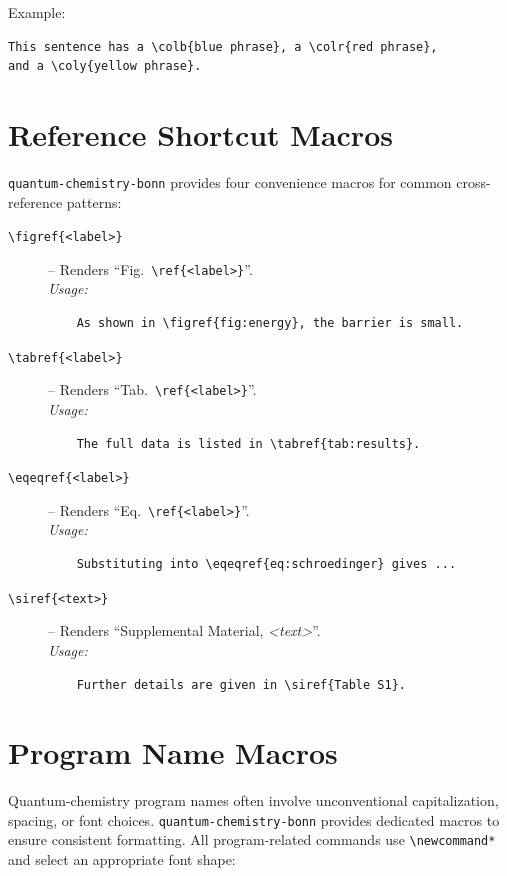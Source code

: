 \documentclass[a4paper,12pt]{article}
\begin{document}
\noindent Example:
\begin{verbatim}
This sentence has a \colb{blue phrase}, a \colr{red phrase}, 
and a \coly{yellow phrase}.
\end{verbatim}

\section{Reference Shortcut Macros}
\label{sec:refs}
\texttt{quantum-chemistry-bonn} provides four convenience macros for common cross-reference patterns:

\begin{description}
  \item[\texttt{\textbackslash figref\{<label>\}}] – Renders ``Fig.~\verb|\ref{<label>}|''.\\
    \textit{Usage:}
    \begin{verbatim}
    As shown in \figref{fig:energy}, the barrier is small.
    \end{verbatim}

  \item[\texttt{\textbackslash tabref\{<label>\}}] – Renders ``Tab.~\verb|\ref{<label>}|''.\\
    \textit{Usage:}
    \begin{verbatim}
    The full data is listed in \tabref{tab:results}.
    \end{verbatim}

  \item[\texttt{\textbackslash eqeqref\{<label>\}}] – Renders ``Eq.~\verb|\ref{<label>}|''.\\
    \textit{Usage:}
    \begin{verbatim}
    Substituting into \eqeqref{eq:schroedinger} gives ...
    \end{verbatim}

  \item[\texttt{\textbackslash siref\{<text>\}}] – Renders ``Supplemental Material, \textit{<text>}''.\\
    \textit{Usage:}
    \begin{verbatim}
    Further details are given in \siref{Table S1}.
    \end{verbatim}
\end{description}

\section{Program Name Macros}
\label{sec:programs}
Quantum-chemistry program names often involve unconventional capitalization, spacing, or font choices. \texttt{quantum-chemistry-bonn} provides dedicated macros to ensure consistent formatting. All program-related commands use \verb|\newcommand*| and select an appropriate font shape:
\end{document}
